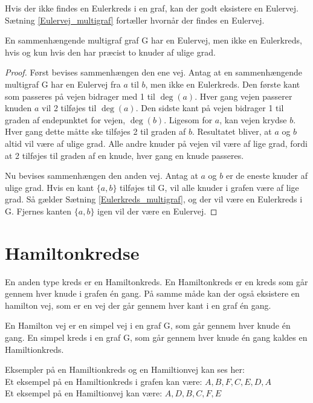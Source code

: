 \noindent Hvis der ikke findes en Eulerkreds i en graf, kan der godt eksistere en Eulervej. 
Sætning \ref{Eulervej_multigraf} fortæller hvornår der findes en Eulervej. 

\begin{thm} \label{Eulervej_multigraf}
En sammenhængende multigraf graf G har en Eulervej, men ikke en Eulerkreds, hvis og kun hvis den har præcist to knuder af ulige grad.  
\end{thm} 

\begin{proof}
Først bevises sammenhængen den ene vej. 
Antag at en sammenhængende multigraf G har en Eulervej fra $a$ til $b$, men ikke en Eulerkreds. 
Den første kant som passeres på vejen bidrager med 1 til $\deg(a)$. 
Hver gang vejen passerer knuden $a$ vil 2 tilføjes til $\deg(a)$. 
Den sidste kant på vejen bidrager 1 til graden af endepunktet for vejen, $\deg(b)$. 
Ligesom for $a$, kan vejen krydse $b$. 
Hver gang dette måtte ske tilføjes 2 til graden af $b$. 
Resultatet bliver, at $a$ og $b$ altid vil være af ulige grad. 
Alle andre knuder på vejen vil være af lige grad, fordi at 2 tilføjes til graden af en knude, hver gang en knude passeres.  

Nu bevises sammenhængen den anden vej.
Antag at $a$ og $b$ er de eneste knuder af ulige grad. 
Hvis en kant $\lbrace a,b \rbrace$ tilføjes til G, vil alle knuder i grafen være af lige grad. 
Så gælder Sætning \ref{Eulerkreds_multigraf}, og der vil være en Eulerkreds i G. 
Fjernes kanten $\lbrace a,b \rbrace$ igen vil der være en Eulervej. 
\end{proof}

\section{Hamiltonkredse}
En anden type kreds er en Hamiltonkreds. 
En Hamiltonkreds er en kreds som går gennem hver knude i grafen én gang. På samme måde kan der også eksistere en hamilton vej, som er en vej der går gennem hver kant i en graf én gang. 

\begin{defn} \label{hamiltion_defn}
En Hamilton vej er en simpel vej i en graf G, som går gennem hver knude én gang.
En simpel kreds i en graf G, som går gennem hver knude én gang kaldes en Hamiltionkreds.
\end{defn}

\begin{exmp}
Eksempler på en Hamiltionkreds og en Hamiltionvej kan ses her: \\



\noindent Et eksempel på en Hamiltionkreds i grafen kan være: $A,B,F,C,E,D,A$\\
Et eksempel på en Hamiltionvej kan være: $A,D,B,C,F,E$
\end{exmp}

